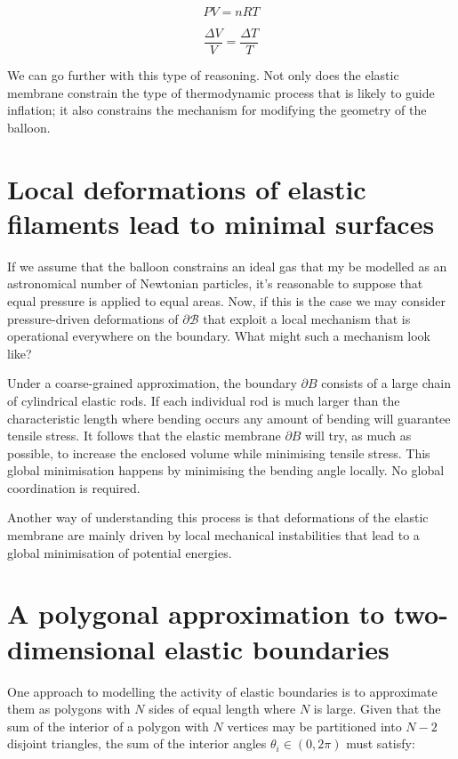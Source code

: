 \documentclass{article}
\begin{document}
\begin{equation}
PV = nRT
\end{equation}

\begin{equation}
\frac{\Delta V}{V} = \frac{\Delta T}{T}
\end{equation}

We can go further with this type of reasoning. Not only does the elastic membrane constrain the type of thermodynamic process that is likely to guide
inflation; it also constrains the mechanism for modifying the geometry of the balloon.

\newpage

\section{Local deformations of elastic filaments lead to minimal surfaces}

If we assume that the balloon constrains an ideal gas that my be modelled as an astronomical number of Newtonian particles, it's reasonable to suppose
that equal pressure is applied to equal areas. Now, if this is the case we may consider pressure-driven deformations of $\partial \mathcal{B}$ that
exploit a local mechanism that is operational everywhere on the boundary. What might such a mechanism look like?

Under a coarse-grained approximation, the boundary $\partial B$ consists of a large chain of cylindrical elastic rods. If each individual rod is much larger
than the characteristic length where bending occurs any amount of bending will guarantee tensile stress. It follows that the elastic membrane $\partial B$ will try, as much as possible, to increase the enclosed volume while minimising tensile stress.
This global minimisation happens by minimising the bending angle locally. No global coordination is required.

Another way of understanding this process is that deformations of the elastic membrane are mainly driven by local mechanical instabilities that lead to
a global minimisation of potential energies.

\section{A polygonal approximation to two-dimensional elastic boundaries}

One approach to modelling the activity of elastic boundaries is to approximate them as polygons with $N$ sides of equal length where $N$ is large.
Given that the sum of the interior of a polygon with $N$ vertices may be partitioned into $N-2$ disjoint triangles, the sum of the interior angles $\theta_i \in (0,2\pi)$ must satisfy:
\end{document}
